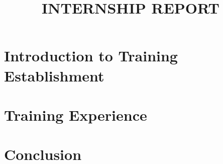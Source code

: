 \documentclass[12pt] {article}
\title{INTERNSHIP REPORT}
\begin{document}


\newpage

\tableofcontents
\newpage
\listoffigures
\listoftables
\newpage
{}


\newpage
\section{Introduction to Training Establishment}


\newpage
\section{Training Experience}







\newpage
\section{Conclusion}


\newpage



 

\end{document}
